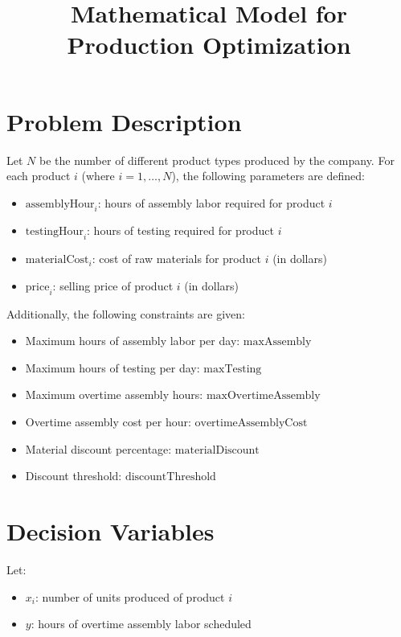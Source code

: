 \documentclass{article}
\begin{document}
\title{Mathematical Model for Production Optimization}
\author{}
\date{}
\maketitle

\section*{Problem Description}

Let \( N \) be the number of different product types produced by the company. For each product \( i \) (where \( i = 1, \ldots, N \)), the following parameters are defined:

\begin{itemize}
    \item \( \text{assemblyHour}_i \): hours of assembly labor required for product \( i \)
    \item \( \text{testingHour}_i \): hours of testing required for product \( i \)
    \item \( \text{materialCost}_i \): cost of raw materials for product \( i \) (in dollars)
    \item \( \text{price}_i \): selling price of product \( i \) (in dollars)
\end{itemize}

Additionally, the following constraints are given:

\begin{itemize}
    \item Maximum hours of assembly labor per day: \( \text{maxAssembly} \)
    \item Maximum hours of testing per day: \( \text{maxTesting} \)
    \item Maximum overtime assembly hours: \( \text{maxOvertimeAssembly} \)
    \item Overtime assembly cost per hour: \( \text{overtimeAssemblyCost} \)
    \item Material discount percentage: \( \text{materialDiscount} \)
    \item Discount threshold: \( \text{discountThreshold} \)
\end{itemize}

\section*{Decision Variables}

Let:
\begin{itemize}
    \item \( x_i \): number of units produced of product \( i \)
    \item \( y \): hours of overtime assembly labor scheduled
\end{itemize}
\end{document}
